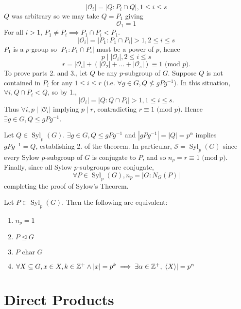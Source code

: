 \documentclass{report}
\newcommand{\cor}[2]{\begin{Corollary}{#1}{}#2\end{Corollary}}
\newenvironment{myproof}[1][\proofname]{%
	\proof[\bfseries #1: ]%
}{\endproof}
\newcommand{\charin}{\text{ char }}
\DeclareMathOperator{\Syl}{Syl}
\newcommand{\mcO}{\mathcal{O}}	\newcommand{\mcP}{\mathcal{P}}
\newcommand{\mcS}{\mathcal{S}}	\newcommand{\mcT}{\mathcal{T}}
\begin{document}
\begin{myproof}
    $$|\mcO_i| = |Q:P_i \cap Q|, 1 \leq i \leq s$$
    $Q$ was arbitrary so we may take $Q = P_1$ giving 
    $$\mcO_1 = 1$$
    For all $i>1$, $P_1 \neq P_i \implies P_1 \cap P_i < P_1$. 
    $$|\mcO_i| = |P_1:P_1 \cap P_i| > 1, 2 \leq i \leq s$$
    $P_1$ is a $p$-group so $|P_1: P_1 \cap P_i|$ must be a power of $p$, hence
    $$p \mid |\mcO_i|, 2 \leq i \leq s$$
    $$r = |\mcO_i| + (|\mcO_2| + \dots + |\mcO_s|) \equiv 1 \text{ (mod }p).$$
    To prove parts 2. and 3., let $Q$ be any $p$-subgroup of $G$. Suppose $Q$ is not contained in $P_i$ for any $1 \leq i \leq r$ (i.e. $\forall g \in G, Q \not\leq gPg^{-1}$). In this situation, $\forall i, Q \cap P_i < Q$, so by 1.,
    $$|\mcO_i| = |Q: Q\cap P_i| > 1, 1 \leq i \leq s.$$
    Thus $\forall i, p \mid |\mcO_i|$ implying $p \mid r$, contradicting $r \equiv 1 \text{ (mod }p)$. Hence $\exists g \in G, Q \leq gPg^{-1}$. 

    Let $Q \in \Syl_p (G)$. $\exists g \in G, Q \leq gPg^{-1}$ and $|gPg^{-1}| = |Q| = p^\alpha$ implies $gPg^{-1} = Q$, establishing 2. of the theorem. In particular, $\mcS = \Syl_p(G)$ since every Sylow $p$-subgroup of $G$ is conjugate to $P$, and so $n_p = r \equiv 1 \text{ (mod }p)$. Finally, since all Sylow $p$-subgroups are conjugate, 
    $$\forall P \in \Syl_p (G), n_p =|G:N_G(P)|$$
    completing the proof of Sylow's Theorem. 
\end{myproof}





\cor{}{Let $P \in \Syl_p(G)$. Then the following are equivalent:
\begin{enumerate}
    \item $n_p = 1$
    \item $P \unlhd G$
    \item $P \charin G$
    \item $\forall X \subseteq G, x \in X, k \in \mathbb{Z}^+ \land  |x| = p^k \implies \exists \alpha \in \mathbb{Z}^+ ,|\langle X \rangle | = p^\alpha$
\end{enumerate}}
\chapter{Direct Products}
\end{document}
